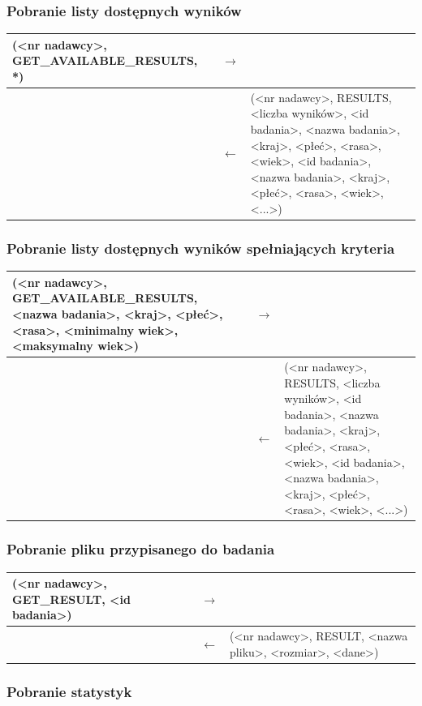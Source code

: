 \subsubsection{Pobranie listy dostępnych wyników}

\begin{longtable}{| p{} | p{}| p{} |} 
\hline
(<nr nadawcy>, GET\_AVAILABLE\_RESULTS, *) & $\rightarrow$ &  \\ \hline
 & $\leftarrow$ & (<nr nadawcy>, RESULTS, <liczba wyników>, <id badania>, <nazwa badania>, <kraj>, <płeć>, <rasa>, <wiek>, <id badania>, <nazwa badania>, <kraj>, <płeć>, <rasa>, <wiek>, <...>) \\ \hline
\end{longtable}

\subsubsection{Pobranie listy dostępnych wyników spełniających kryteria}

\begin{longtable}{| p{} | p{}| p{} |} 
\hline
(<nr nadawcy>, GET\_AVAILABLE\_RESULTS, <nazwa badania>, <kraj>, <płeć>, <rasa>, <minimalny wiek>, <maksymalny wiek>) & $\rightarrow$ &  \\ \hline
 & $\leftarrow$ & (<nr nadawcy>, RESULTS, <liczba wyników>, <id badania>, <nazwa badania>, <kraj>, <płeć>, <rasa>, <wiek>, <id badania>, <nazwa badania>, <kraj>, <płeć>, <rasa>, <wiek>, <...>) \\ \hline
\end{longtable}

\subsubsection{Pobranie pliku przypisanego do badania}

\begin{longtable}{| p{} | p{}| p{} |} 
\hline
(<nr nadawcy>, GET\_RESULT, <id badania>) & $\rightarrow$ &  \\ \hline
 & $\leftarrow$ & (<nr nadawcy>, RESULT, <nazwa pliku>, <rozmiar>, <dane>) \\ \hline
\end{longtable}

\subsubsection{Pobranie statystyk}

